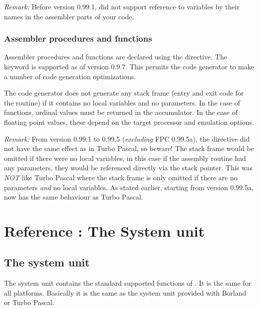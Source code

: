\documentclass{report}
\begin{document}
{\em Remark: } Before version 0.99.1, \fpc did not support
reference to variables by their names in the assembler parts of your code.

\section{Assembler procedures and functions}
Assembler procedures and functions are declared using the
 directive. The  keyword is supported
as of version 0.9.7. This permits the code generator to make a number
of code generation optimizations.

The code generator does not generate any stack frame (entry and exit
code for the routine) if it contains no local variables and no
parameters. In the case of functions, ordinal values must be returned
in the accumulator. In the case of floating point values, these depend
on the target processor and emulation options.

{\em Remark: } From version 0.99.1 to 0.99.5 (\emph{excluding}
FPC 0.99.5a), the  directive did not have the
same effect as in Turbo Pascal, so beware! The stack frame would be
omitted if there were no local variables, in this case if the assembly
routine had any parameters, they would be referenced directly via the stack
pointer. This was \emph{ NOT} like Turbo Pascal where the stack frame is only
omitted if there are no parameters \emph{ and } no local variables. As
stated earlier, starting from version 0.99.5a, \fpc now has the same
behaviour as Turbo Pascal.

%
%

\part{Reference : The System unit}

\chapter{The system unit}
\label{ch:refchapter}
The system unit contains the standard supported functions of \fpc. It is the
same for all platforms. Basically it is the same as the system unit provided
with Borland or Turbo Pascal.
\end{document}

